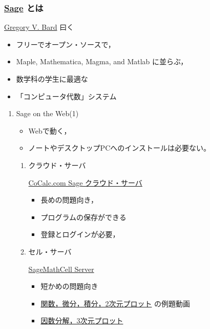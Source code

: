 \documentclass[dvipdfmx,11pat]{jarticle}
\begin{document}
\subsubsection{\href{http://www.sagemath.org}{Sage} とは}
\label{sec:orgd73b297}

\href{http://www.gregorybard.com/Sage.html}{Gregory V. Bard} 曰く

\begin{itemize}
\item フリーでオープン・ソースで，
\item Maple, Mathematica, Magma, and Matlab に並らぶ，
\item 数学科の学生に最適な
\item 「コンピュータ代数」システム
\end{itemize}

\begin{enumerate}
\item Sage on the Web(1)
\label{sec:org6374767}

\begin{itemize}
\item Webで動く，
\item ノートやデスクトップPCへのインストールは必要ない。
\end{itemize}

\begin{enumerate}
\item クラウド・サーバ
\label{sec:org09718de}

\href{http://www.cocalc.com/}{CoCalc.com Sage クラウド・サーバ} 

\begin{itemize}
\item 長めの問題向き，
\item プログラムの保存ができる
\item 登録とログインが必要，
\end{itemize}

\item セル・サーバ
\label{sec:orgbb2746e}

\href{http://sagecell.sagemath.org/}{SageMathCell Server}

\begin{itemize}
\item 短かめの問題向き

\item \href{http://www.gregorybard.com/videos/Sage\_part1.swf}{関数，微分，積分，2次元プロット} の例題動画

\item \href{http://www.gregorybard.com/videos/Sage\_part2.swf}{因数分解，3次元プロット}
\end{itemize}


\end{enumerate}
\end{enumerate}
\end{document}
